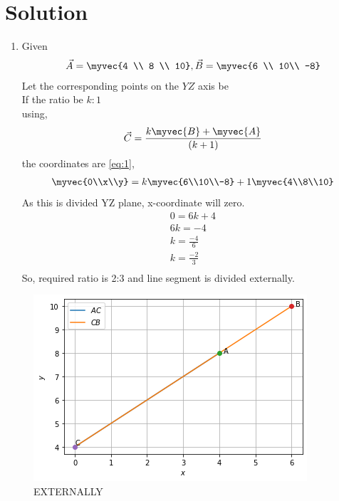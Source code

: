\documentclass[journal,12pt,twocolumn]{IEEEtran}
\begin{document}
\section{Solution}
\begin{enumerate}
\item Given 
\begin{align}
  \vec{A} = \myvec{4 \\ 8 \\ 10}, \vec{B}=\myvec{6 \\ 10\\ -8} \label{eq:1}
\end{align}
Let the corresponding points on the $YZ$ axis be 
\\
If the ratio be $k:1$
\\
using, \\
\begin{align}
\vec{C}=\frac{k\myvec{B}+\myvec{A}}{(k+1)}
\end{align}
the coordinates are
\eqref{eq:1},
\begin{align}
\myvec{0\\x\\y}=k\myvec{6\\10\\-8}+1\myvec{4\\8\\10}\\
\end{align}
 As this is divided YZ plane, x-coordinate will zero. \\
 \begin{align}
      0=6k+4\\
      6k=-4\\
      k=\frac{-4}{6}\\
      k=\frac{-2}{3}\\
 \end{align}
 So, required ratio is 2:3 and line segment is divided externally. 
\end{enumerate}
\begin{figure}[!ht]
    \centering
\includegraphics[width=\columnwidth]{figure7.png}
    \caption{EXTERNALLY}
    \label{fig:EXTERNALLY.}
\end{figure}  
\end{document}
